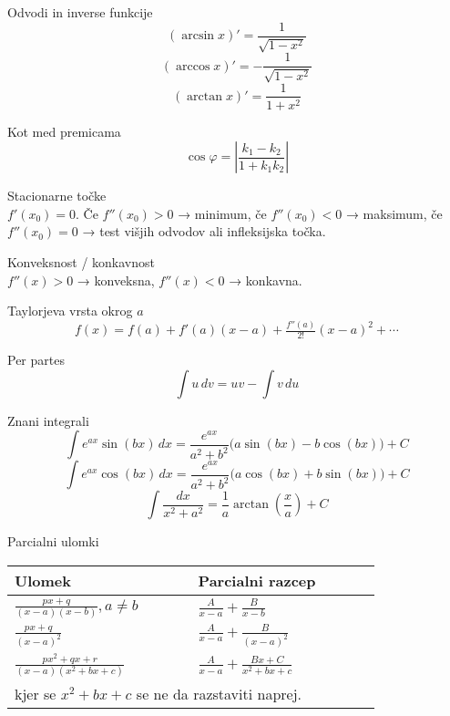 \documentclass[a4paper,10pt]{article}
\begin{document}
\vspace*{5mm}
\begin{multicols}{2}

\begin{formulaBox}{Odvodi in inverse funkcije}
\[
(\arcsin x)' = \frac{1}{\sqrt{1-x^2}}\]
\[(\arccos x)' = -\frac{1}{\sqrt{1-x^2}}\]
\[(\arctan x)' = \frac{1}{1+x^2}\]
\end{formulaBox}

\begin{formulaBox}{Kot med premicama}
\[
\cos \varphi = |\frac{k_1 - k_2}{1+k_1 k_2}|
\]
\end{formulaBox}

\begin{formulaBox}{Stacionarne točke}
	\\
$f'(x_0)=0$. Če $f''(x_0)>0$ → minimum, če $f''(x_0)<0$ → maksimum, če $f''(x_0)=0$ → test višjih odvodov ali infleksijska točka.
\end{formulaBox}

\begin{formulaBox}{Konveksnost / konkavnost}
	\\
$f''(x)>0$ → konveksna, $f''(x)<0$ → konkavna.
\end{formulaBox}

\begin{formulaBox}{Taylorjeva vrsta okrog $a$}
\[
f(x)=f(a)+f'(a)(x-a)+\tfrac{f''(a)}{2!}(x-a)^2+\cdots
\]
\end{formulaBox}

\begin{formulaBox}{Per partes}
\[
\int u\,dv = uv - \int v\,du
\]
\end{formulaBox}

\begin{formulaBox}{Znani integrali}
\[
\int e^{ax}\sin(bx)\,dx = \frac{e^{ax}}{a^2+b^2}\big(a\sin(bx) - b\cos(bx)\big) + C
\]
\[
\int e^{ax}\cos(bx)\,dx = \frac{e^{ax}}{a^2+b^2}\big(a\cos(bx) + b\sin(bx)\big) + C
\]
\[
\int \frac{dx}{x^2+a^2} = \frac{1}{a}\arctan\!\left(\frac{x}{a}\right)+C
\]
\end{formulaBox}

\begin{formulaBox}{Parcialni ulomki}
	\\
\begin{tabular}{p{0.4\linewidth}p{0.4\linewidth}}
 Ulomek &  Parcialni razcep \\
\hline
$\displaystyle\frac{px+q}{(x-a)(x-b)}, a \ne b$ & $\displaystyle\frac{A}{x-a} + \frac{B}{x-b}$ \\[4mm]
$\displaystyle\frac{px+q}{(x-a)^2}$ & $\displaystyle\frac{A}{x-a} + \frac{B}{(x-a)^2}$ \\[4mm]
$\displaystyle\frac{px^2+qx+r}{(x-a)(x^2+bx+c)}$ & $\displaystyle\frac{A}{x-a} + \frac{Bx+C}{x^2+bx+c}$ \\[4mm]
\multicolumn{2}{p{\dimexpr.8\linewidth+4\tabcolsep\relax}}{%
    kjer se $x^2+bx+c$ se ne da razstaviti naprej.} \\
\end{tabular}
\end{formulaBox}


\end{multicols}
\end{document}

